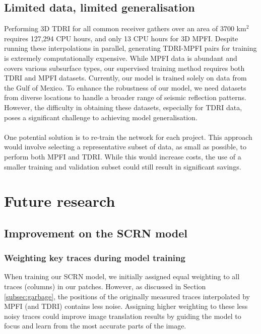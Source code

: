 \subsection{Limited data, limited generalisation}
Performing 3D TDRI for all common receiver gathers over an area of 3700 km$^{2}$ requires 127,294 CPU hours, and only 13 CPU hours for 3D MPFI. Despite running these interpolations in parallel, generating TDRI-MPFI pairs for training is extremely computationally expensive. While MPFI data is abundant and covers various subsurface types, our supervised training method requires both TDRI and MPFI datasets. Currently, our model is trained solely on data from the Gulf of Mexico. To enhance the robustness of our model, we need datasets from diverse locations to handle a broader range of seismic reflection patterns. However, the difficulty in obtaining these datasets, especially for TDRI data, poses a significant challenge to achieving model generalisation.
\\\\
One potential solution is to re-train the network for each project. This approach would involve selecting a representative subset of data, as small as possible, to perform both MPFI and TDRI. While this would increase costs, the use of a smaller training and validation subset could still result in significant savings.


\section{Future research}

\subsection{Improvement on the SCRN model} \label{subsec:freqaug}

\subsubsection{Weighting key traces during model training}
When training our SCRN model, we initially assigned equal weighting to all traces (columns) in our patches. However, as discussed in Section \ref{subsec:garbage}, the positions of the originally measured traces interpolated by MPFI (and TDRI)  contains less noise. Assigning higher weighting to these less noisy traces could improve image translation results by guiding the model to focus and learn from the most accurate parts of the image.

